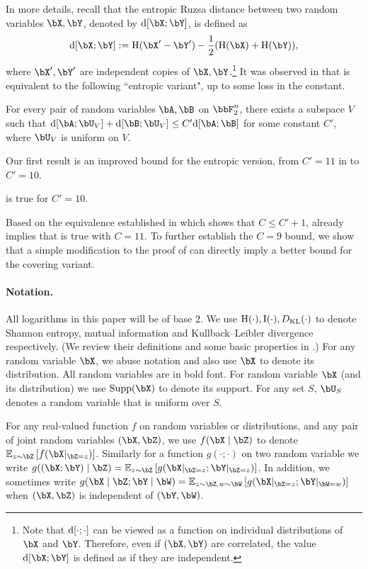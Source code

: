 \documentclass{article}
\DeclarePairedDelimiter{\paren}{(}{)}
\DeclarePairedDelimiter{\sqpar}{[}{]}
\newcommand{\ent}{\mathrm{H}\paren}
\newcommand{\info}{\mathrm{I}\paren}
\newcommand{\Ruz}{\mathrm{d}\sqpar}
\begin{document}
In more details, recall that the entropic Ruzsa distance between two random variables $\bX,\bY$, denoted by $\Ruz{\bX;\bY}$, is defined as $$\Ruz{\bX;\bY}:=\ent{\bX'-\bY'}-\frac{1}{2}(\ent{\bX}+\ent{\bY}),$$
where $\bX',\bY'$ are independent copies of $\bX,\bY$.\footnote{Note that $\Ruz{\cdot;\cdot}$ can be viewed as a function on individual distributions of $\bX$ and $\bY$. Therefore, even if $(\bX,\bY)$ are correlated, the value $\Ruz{\bX;\bY}$ is defined as if they are independent.} It was observed in \cite{GMT23} that  is equivalent to the following ``entropic variant", up to some loss in the constant.
\begin{conjecture}\label{conj:Marton-entropic}
For every pair of random variables $\bA,\bB$ on $\bbF_2^n$, there exists a subspace $V$ such that $\Ruz{\bA;\bU_V}+\Ruz{\bB;\bU_V}\le C' \Ruz{\bA;\bB}$ for some constant $C'$, where $\bU_V$ is uniform on $V$.
\end{conjecture}
\noindent
Our first result is an improved bound for the entropic version, from $C'=11$ in \cite{GGMT23} to $C'=10$.
\begin{theorem}\label{theorem:Marton-entropic}
 is true for $C'=10$.
\end{theorem}
\noindent
Based on the equivalence established in \cite{GMT23} which shows that $C\le C'+1$,  already implies that  is true with $C=11$. To further establish the $C=9$ bound, we show that a simple modification to the proof of  can directly imply a better bound for the covering variant.


\paragraph{Notation.} All logarithms in this paper will be of base $2$. We use $\ent{\cdot},\info{\cdot},D_{\mathrm{KL}}(\cdot)$ to denote Shannon entropy, mutual information and Kullback–Leibler divergence respectively. (We review their definitions and some basic properties in .) For any random variable $\bX$, we abuse notation and also use $\bX$ to denote its distribution. All random variables are in bold font. For random variable $\bX$ (and its distribution) we use $\Supp(\bX)$ to denote its support. For any set $S$, $\bU_S$ denotes a random variable that is uniform over $S$. 

For any real-valued function $f$ on random variables or distributions, and any pair of joint random variables $(\bX,\bZ)$, we use $f(\bX\mid\bZ)$ to denote $\ex[z\sim\bZ]{f(\bX|_{\bZ=z})}$. Similarly for a function $g(\cdot;\cdot)$ on two random variable we write $g((\bX;\bY)\mid\bZ)=\ex[z\sim\bZ]{g(\bX|_{\bZ=z};\bY|_{\bZ=z})}$. In addition, we sometimes write $g(\bX\mid \bZ ;\bY\mid \bW)=\ex[z\sim\bZ,w\sim\bW]{g(\bX|_{\bZ=z};\bY|_{\bW=w})}$ when $(\bX,\bZ)$ is independent of $(\bY,\bW)$.
\end{document}
